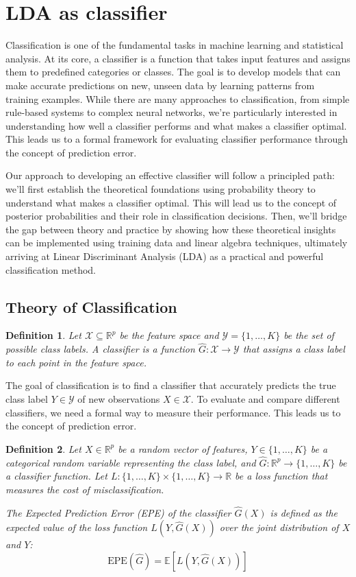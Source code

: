 \documentclass[a4paper,12pt]{article}
\newtheorem{definition}{Definition}
\begin{document}
\section{LDA as classifier}


Classification is one of the fundamental tasks in machine learning and statistical analysis. At its core, a classifier is a function that takes input features and assigns them to predefined categories or classes. The goal is to develop models that can make accurate predictions on new, unseen data by learning patterns from training examples. While there are many approaches to classification, from simple rule-based systems to complex neural networks, we're particularly interested in understanding how well a classifier performs and what makes a classifier optimal. This leads us to a formal framework for evaluating classifier performance through the concept of prediction error.

Our approach to developing an effective classifier will follow a principled path: we'll first establish the theoretical foundations using probability theory to understand what makes a classifier optimal. This will lead us to the concept of posterior probabilities and their role in classification decisions. Then, we'll bridge the gap between theory and practice by showing how these theoretical insights can be implemented using training data and linear algebra techniques, ultimately arriving at Linear Discriminant Analysis (LDA) as a practical and powerful classification method.

\subsection{Theory of Classification}

\begin{definition}
Let $\mathcal{X} \subseteq \mathbb{R}^p$ be the feature space and $\mathcal{Y} = \{1,\ldots,K\}$ be the set of possible class labels. A classifier is a function $\hat{G}: \mathcal{X} \to \mathcal{Y}$ that assigns a class label to each point in the feature space.
\end{definition}

The goal of classification is to find a classifier that accurately predicts the true class label $Y \in \mathcal{Y}$ of new observations $X \in \mathcal{X}$. To evaluate and compare different classifiers, we need a formal way to measure their performance. This leads us to the concept of prediction error.

\begin{definition}
Let $X \in \mathbb{R}^p$ be a random vector of features, $Y \in \{1,\ldots,K\}$ be a categorical random variable representing the class label, and $\hat{G}: \mathbb{R}^p \to \{1,\ldots,K\}$ be a classifier function. Let $L: \{1,\ldots,K\} \times \{1,\ldots,K\} \to \mathbb{R}$ be a loss function that measures the cost of misclassification.

    The Expected Prediction Error (EPE) of the classifier $\hat{G}(X)$ is defined as the expected value of the loss function $L(Y, \hat{G}(X))$ over the joint distribution of $X$ and $Y$:
\[
\text{EPE}(\hat{G}) = \mathbb{E}[L(Y, \hat{G}(X))]
\]
\end{definition}
\end{document}
